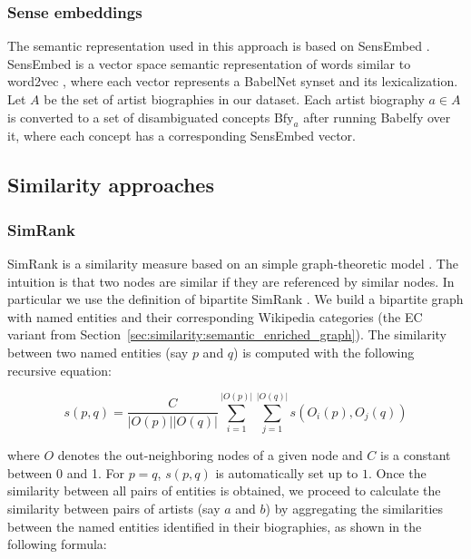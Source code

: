 \subsubsection{Sense embeddings}\label{sec:similarity:sense_embeddings}

The semantic representation used in this approach is based on SensEmbed \citep{Iacobaccietal2015}. SensEmbed is a vector space semantic representation of words similar to word2vec \citep{Mikolovetal2013},
where each vector represents a BabelNet synset and its lexicalization. Let $A$ be the set of artist biographies in our dataset. Each artist biography $a \in A$ is converted to a set of disambiguated concepts $\text{Bfy}_{a}$ after running Babelfy over it, where each concept has a corresponding SensEmbed vector.


\subsection{Similarity approaches}

\subsubsection{SimRank} %

SimRank is a similarity measure based on an simple graph-theoretic model \citep{jeh2002simrank}. The intuition is that two nodes are similar if they are referenced by similar nodes. In particular we use the definition of bipartite SimRank \citep{jeh2002simrank}. We build a bipartite graph with named entities and their corresponding Wikipedia categories (the EC variant from Section~\ref{sec:similarity:semantic_enriched_graph}). The similarity between two named entities (say $p$ and $q$) is computed with the following recursive equation:

\begin{equation}
s(p,q) = \frac{C}{|O(p)||O(q)|} \sum_{i=1}^{|O(p)|} \sum_{j=1}^{|O(q)|} s(O_i(p), O_j(q))
\end{equation}

where $O$ denotes the out-neighboring nodes of a given node and $C$ is a constant between 0 and 1. For $p = q$, $s(p,q)$ is automatically set up to $1$.
Once the similarity between all pairs of entities is obtained, we proceed to calculate the similarity between pairs of artists (say $a$ and $b$) by aggregating the similarities between the named entities identified in their biographies, as shown in the following formula:


